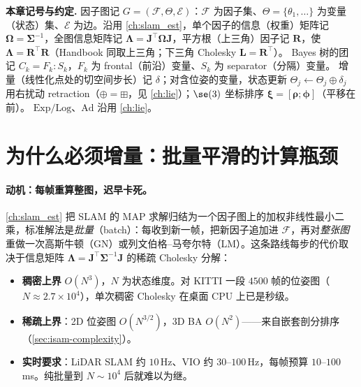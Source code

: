 \begin{note}
\textbf{本章记号与约定.}\;
因子图记 $G=(\mathcal{F},\Theta,\mathcal{E})$：$\mathcal{F}$ 为因子集、$\Theta=\{\theta_1,\dots\}$ 为变量（状态）集、$\mathcal{E}$ 为边\cite{kaess2012isam2}。沿用 \cref{ch:slam_est}，单个因子的信息（权重）矩阵记 $\boldsymbol{\Omega}=\boldsymbol{\Sigma}^{-1}$，全图信息矩阵记 $\boldsymbol{\Lambda}=\mathbf{J}^\top\boldsymbol{\Omega}\mathbf{J}$，平方根（上三角）因子记 $\mathbf{R}$，使 $\boldsymbol{\Lambda}=\mathbf{R}^\top\mathbf{R}$（Handbook\cite{carlone2026handbook} 同取上三角；下三角 Cholesky $\mathbf{L}=\mathbf{R}^\top$）。
Bayes 树的团记 $C_k=F_k:S_k$，$F_k$ 为 frontal（前沿）变量、$S_k$ 为 separator（分隔）变量。
增量（线性化点处的切空间步长）记 $\delta$；对含位姿的变量，状态更新 $\Theta_j\leftarrow\Theta_j\oplus\delta_j$ 用右扰动 retraction（$\oplus=\boxplus$，见 \cref{ch:lie}）；$\se(3)$ 坐标排序 $\boldsymbol{\xi}=[\boldsymbol{\rho};\boldsymbol{\phi}]$（平移在前）。
$\mathrm{Exp}/\mathrm{Log}$、$\mathrm{Ad}$ 沿用 \cref{ch:lie}。
\end{note}

\section{为什么必须增量：批量平滑的计算瓶颈}
\label{sec:isam-why}

\paragraph{动机：每帧重算整图，迟早卡死。}
\cref{ch:slam_est} 把 SLAM 的 MAP 求解归结为一个因子图上的加权非线性最小二乘，标准解法是\emph{批量}（batch）：每收到新一帧，把新因子追加进 $\mathcal{F}$，再对\emph{整张图}重做一次高斯牛顿（GN）或列文伯格--马夸尔特（LM）。这条路线每步的代价取决于信息矩阵 $\boldsymbol{\Lambda}=\mathbf{J}^\top\boldsymbol{\Sigma}^{-1}\mathbf{J}$ 的稀疏 Cholesky 分解\cite{dellaert2006square}：
\begin{itemize}
  \item \textbf{稠密上界} $O(N^3)$，$N$ 为状态维度。对 KITTI 一段 $4500$ 帧的位姿图（$N\approx 2.7\times10^4$），单次稠密 Cholesky 在桌面 CPU 上已是秒级。
  \item \textbf{稀疏上界}：2D 位姿图 $O(N^{3/2})$，3D BA $O(N^2)$——来自嵌套剖分排序（\cref{sec:isam-complexity}）。
  \item \textbf{实时要求}：LiDAR SLAM 约 $10$\,Hz、VIO 约 $30$--$100$\,Hz，每帧预算 $10$--$100$\,ms。纯批量到 $N\sim10^4$ 后就难以为继。
\end{itemize}

